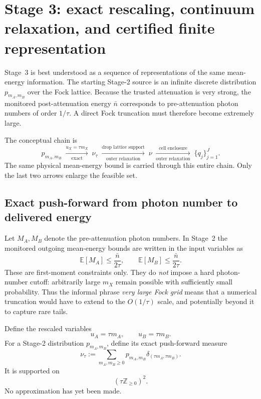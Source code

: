 \documentclass[11pt]{article}
\theoremstyle{remark}
\begin{document}
\section{Stage 3: exact rescaling, continuum relaxation, and certified finite representation}
\label{sec:stage3-rigorous}

Stage~3 is best understood as a sequence of representations of the same
mean-energy information.  The starting Stage-2 source is an infinite discrete
distribution \(p_{m_A,m_B}\) over the Fock lattice.  Because the trusted
attenuation is very strong, the monitored post-attenuation energy
\(\bar n\) corresponds to pre-attenuation photon numbers of order
\(1/\tau\).  A direct Fock truncation must therefore become extremely large.

The conceptual chain is
\begin{equation}
\boxed{
p_{m_A,m_B}
\;\xrightarrow[\text{exact}]{u_X=\tau m_X}\;
\nu_\tau
\;\xrightarrow[\text{outer relaxation}]{\text{drop lattice support}}\;
\nu
\;\xrightarrow[\text{outer relaxation}]{\text{cell enclosure}}\;
\{q_j\}_{j=1}^{J}.
}
\label{eq:stage3-chain}
\end{equation}
The same physical mean-energy bound is carried through this entire chain.
Only the last two arrows enlarge the feasible set.

\subsection{Exact push-forward from photon number to delivered energy}

Let \(M_A,M_B\) denote the pre-attenuation photon numbers.  In Stage~2 the
monitored outgoing mean-energy bounds are written in the input variables as
\begin{equation}
    \mathbb E[M_A]\le\frac{\bar n}{2\tau},
    \qquad
    \mathbb E[M_B]\le\frac{\bar n}{2\tau}.
    \label{eq:stage3-input-energy}
\end{equation}
These are first-moment constraints only.  They do \emph{not} impose a hard
photon-number cutoff: arbitrarily large \(m_X\) remain possible with
sufficiently small probability.  Thus the informal phrase
\emph{very large Fock grid} means that a numerical truncation would have to
extend to the \(O(1/\tau)\) scale, and potentially beyond it to capture rare
tails.

Define the rescaled variables
\begin{equation}
    u_A=\tau m_A,
    \qquad
    u_B=\tau m_B.
    \label{eq:stage3-rescaling}
\end{equation}
For a Stage-2 distribution \(p_{m_A,m_B}\), define its exact push-forward
measure
\begin{equation}
    \boxed{
    \nu_\tau
    :=
    \sum_{m_A,m_B\ge0}
      p_{m_A,m_B}
      \delta_{(\tau m_A,\tau m_B)}.
    }
    \label{eq:stage3-lattice-measure}
\end{equation}
It is supported on
\[
    (\tau\mathbb Z_{\ge0})^2.
\]
No approximation has yet been made.
\end{document}
